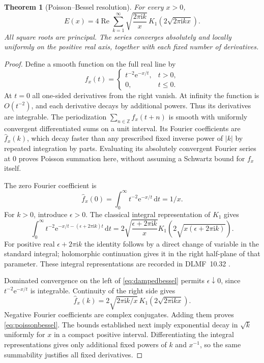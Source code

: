 \documentclass[11pt,a4paper]{article}
\newtheorem{theorem}{Theorem}[section]
\theoremstyle{definition}
\theoremstyle{remark}
\newcommand{\dd}{\,\mathrm d}
\newcommand{\e}{\mathrm e}
\newcommand{\ii}{\mathrm i}
\newcommand{\Rea}{\operatorname{Re}}
\numberwithin{equation}{section}
\begin{document}
\begin{theorem}[Poisson--Bessel resolution]\label{thm:poisson}
For every $x>0$,
\begin{equation}\label{eq:poissonbessel}
 E(x)=4\Rea\sum_{k=1}^{\infty}
 \sqrt{\frac{2\pi\ii k}{x}}\,
 K_1\left(2\sqrt{2\pi\ii kx}\right).
\end{equation}
All square roots are principal. The series converges absolutely and locally uniformly on the positive real axis, together with each fixed number of derivatives.
\end{theorem}
\begin{proof}
Define a smooth function on the full real line by
\[
 f_x(t)=
 \begin{cases}
 t^{-2}\e^{-x/t},&t>0,\\
 0,&t\le0.
 \end{cases}
\]
At $t=0$ all one-sided derivatives from the right vanish. At infinity the function is $O(t^{-2})$, and each derivative decays by additional powers. Thus its derivatives are integrable. The periodization $\sum_{n\in\mathbb Z}f_x(t+n)$ is smooth with uniformly convergent differentiated sums on a unit interval. Its Fourier coefficients are $\widehat f_x(k)$, which decay faster than any prescribed fixed inverse power of $|k|$ by repeated integration by parts. Evaluating its absolutely convergent Fourier series at $0$ proves Poisson summation here, without assuming a Schwartz bound for $f_x$ itself.

The zero Fourier coefficient is
\[
 \widehat f_x(0)=\int_0^\infty t^{-2}\e^{-x/t}\dd t=1/x.
\]
For $k>0$, introduce $\epsilon>0$. The classical integral representation of $K_1$ gives
\begin{equation}\label{eq:dampedbessel}
 \int_0^\infty t^{-2}\e^{-x/t-(\epsilon+2\pi\ii k)t}\dd t
 =2\sqrt{\frac{\epsilon+2\pi\ii k}{x}}
 K_1\left(2\sqrt{x(\epsilon+2\pi\ii k)}\right).
\end{equation}
For positive real $\epsilon+2\pi\ii k$ the identity follows by a direct change of variable in the standard integral; holomorphic continuation gives it in the right half-plane of that parameter. These integral representations are recorded in DLMF~10.32 \cite{dlmf-integrals}.

Dominated convergence on the left of \eqref{eq:dampedbessel} permits $\epsilon\downarrow0$, since $t^{-2}\e^{-x/t}$ is integrable. Continuity of the right side gives
\[
 \widehat f_x(k)=2\sqrt{2\pi\ii k/x}\,
 K_1(2\sqrt{2\pi\ii kx}).
\]
Negative Fourier coefficients are complex conjugates. Adding them proves \eqref{eq:poissonbessel}. The bounds established next imply exponential decay in $\sqrt{k}$ uniformly for $x$ in a compact positive interval. Differentiating the integral representations gives only additional fixed powers of $k$ and $x^{-1}$, so the same summability justifies all fixed derivatives.
\end{proof}
\end{document}
